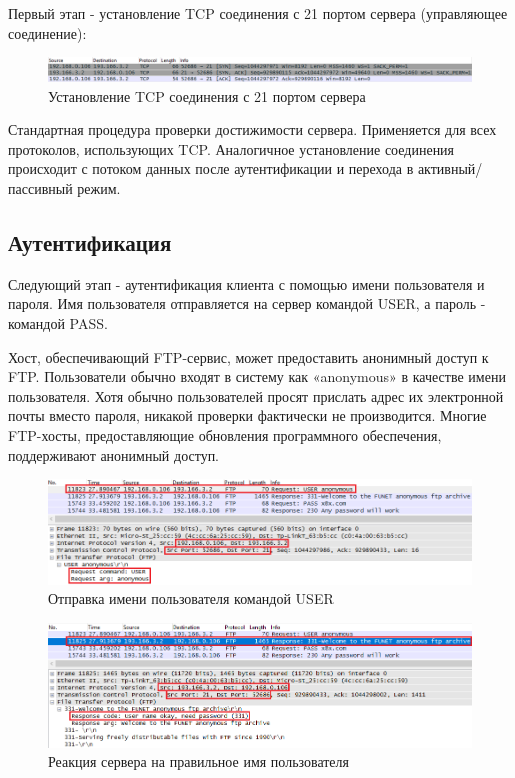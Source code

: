 \documentclass[14pt,a4paper,report]{report}
\begin{document}
Первый этап - установление TCP соединения с 21 портом сервера (управляющее соединение):

\begin{figure}[h!]
	\centering
	\includegraphics[scale = 0.62]{images/ftp1.png}
	
	\caption{Установление TCP соединения с 21 портом сервера}
	\label{image:3}
\end{figure}

Стандартная процедура проверки достижимости сервера. Применяется для всех протоколов, использующих TCP. Аналогичное установление соединения происходит с потоком данных после аутентификации и перехода в активный/пассивный режим.

\subsection{Аутентификация}

Следующий этап - аутентификация клиента с помощью имени пользователя и пароля. Имя пользователя отправляется на сервер командой USER, а пароль - командой PASS.

Хост, обеспечивающий FTP-сервис, может предоставить анонимный доступ к FTP. Пользователи обычно входят в систему как «anonymous» в качестве имени пользователя. Хотя обычно пользователей просят прислать адрес их электронной почты вместо пароля, никакой проверки фактически не производится. Многие FTP-хосты, предоставляющие обновления программного обеспечения, поддерживают анонимный доступ.

\begin{figure}[h!]
	\centering
	\includegraphics[scale = 0.70]{images/ftp2.png}
	
	\caption{Отправка имени пользователя командой USER}
	\label{image:4}
\end{figure}

\begin{figure}[h!]
	\centering
	\includegraphics[scale = 0.70]{images/ftp3.png}
	
	\caption{Реакция сервера на правильное имя пользователя}
	\label{image:5}
\end{figure}
\end{document}
